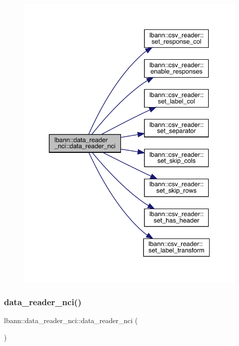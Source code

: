 \begin{figure}[H]
\begin{center}
\leavevmode
\includegraphics[width=332pt]{classlbann_1_1data__reader__nci_aec1e091b879a3a2dee1329dd3e245bd3_cgraph}
\end{center}
\end{figure}
\mbox{\label{classlbann_1_1data__reader__nci_a42a40564a0110df69b99832e520111e6}} 
\subsubsection{\texorpdfstring{data\+\_\+reader\+\_\+nci()}{data\_reader\_nci()}\hspace{0.1cm}{\footnotesize\ttfamily [2/3]}}
{\footnotesize\ttfamily lbann\+::data\+\_\+reader\+\_\+nci\+::data\+\_\+reader\+\_\+nci (\begin{DoxyParamCaption}{ }\end{DoxyParamCaption})}



